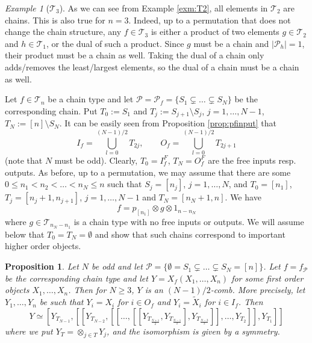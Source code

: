 \documentclass[12pt]{article}
\newtheorem{prop}{Proposition}
\theoremstyle{definition}
\theoremstyle{remark}
\newtheorem{exm}{Example}
\def\Te{\mathcal T}
\def\Pe{\mathcal P}
\begin{document}
\begin{exm}[$\Te_3$]
As we can see from Example \ref{exm:T2}, all elements in $\Te_2$ are chains. This is
also true for $n=3$. Indeed, up to a permutation that does not change the chain structure, 
any $f\in \Te_3$ is either a product of two elements $g\in \Te_2$ and $h\in \Te_1$,
or the dual of such a  product. Since $g$ must be a chain and $|\Pe_h|=1$, their product
must be a chain as well. Taking the dual of a chain only adds/removes the least/largest
elements, so the dual of a chain must be a chain as well.
\end{exm}

Let $f\in \Te_n$ be a chain type and let $\Pe=\Pe_f=\{S_1\subsetneq \dots \subsetneq
S_N\}$ be the corresponding chain. Put $T_0:=S_1$ and $T_j:=S_{j+1}\setminus S_{j}$,
$j=1,\dots, N-1$, $T_{N}:=[n]\setminus S_N$.  It can be easily seen from Proposition \ref{prop:pfinput} that 
\begin{equation}\label{eq:chain_io}
I_f=\bigcup_{l=0}^{(N-1)/2}{T_{2j}}, \qquad O_f=\bigcup_{l=0}^{(N-1)/2}{T_{2j+1}}
\end{equation}
(note that $N$ must be odd). Clearly, $T_0=I_f^F$, $T_{N}=O_f^F$ are the free inputs resp.
outputs. As before, up to a permutation, we may assume that  there are some $0\le
n_1<n_2<\dots<n_{N}\le n$ such that $S_j=[n_j]$, $j=1,\dots,N$, and $T_0=[n_1]$,
$T_j=[n_j+1, n_{j+1}]$, $j=1,\dots, N-1$ and $T_N=[n_N+1,n]$. We have  
\[
f=p_{[n_1]}\otimes g\otimes 1_{n-n_N}
\]
where $g\in \Te_{n_N-n_1}$ is a chain type with no free inputs or outputs. We will assume below that
$T_0=T_N=\emptyset$ and  show that such chains correspond to important higher order objects. 


\begin{prop}\label{prop:chains_combs}  Let $N$ be odd and let $\Pe=\{\emptyset= S_1\subsetneq \dots
\subsetneq S_N= [n]\}$. Let $f=f_\Pe$ be the corresponding chain type and let
$Y=X_f(X_1,\dots,X_n)$ for some first order objects $X_1,\dots, X_n$. Then for $N\ge 3$, $Y$ is an $(N-1)/2$-comb. 
More precisely, let $Y_1,\dots, Y_n$ be such that $Y_i=X_i$ for $i\in O_f$ and $Y_i=\tilde X_i$ for $i\in I_f$.
Then
\[
Y\simeq
[Y_{T_{N-1}},[[Y_{T_{N-2}},[[\dots,[[Y_{T_{\frac{N+1}2}},Y_{T_{\frac{N-1}2}}],Y_{T_{\frac{N-3}2}}]],\dots,Y_{T_2}]],Y_{T_1}]] 
 \]
 where we put $Y_T=\otimes_{j\in T} Y_j$, 
 and the isomorphism is given by a symmetry.

\end{prop}
\end{document}
